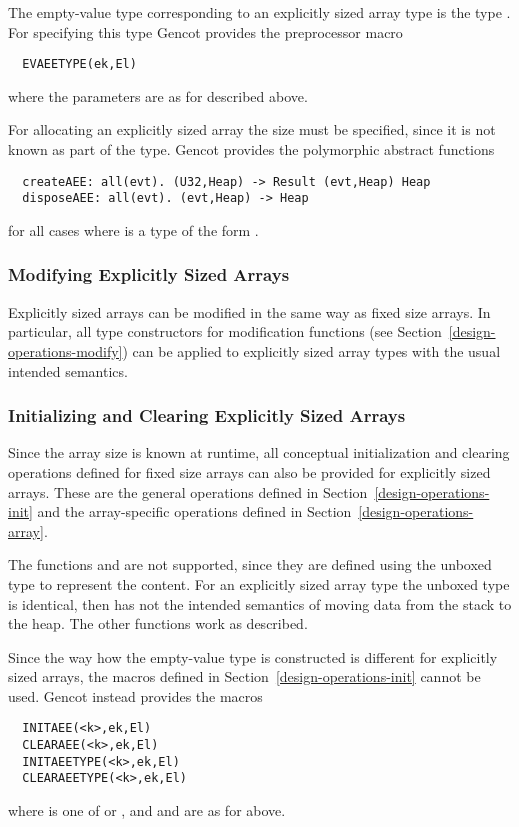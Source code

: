 The empty-value type corresponding to an explicitly sized array type  is the type .
For specifying this type Gencot provides the preprocessor macro
\begin{verbatim}
  EVAEETYPE(ek,El)
\end{verbatim}
where the parameters are as for  described above. 

For allocating an explicitly sized array the size must be specified, since it is not known as part of the type.
Gencot provides the polymorphic abstract functions
\begin{verbatim}
  createAEE: all(evt). (U32,Heap) -> Result (evt,Heap) Heap
  disposeAEE: all(evt). (evt,Heap) -> Heap
\end{verbatim}
for all cases where  is a type of the form .

\subsubsection{Modifying Explicitly Sized Arrays}

Explicitly sized arrays can be modified in the same way as fixed size arrays. In particular, 
all type constructors for modification functions (see Section~\ref{design-operations-modify}) can be applied to 
explicitly sized array types with the usual intended semantics. 

\subsubsection{Initializing and Clearing Explicitly Sized Arrays}

Since the array size is known at runtime, all conceptual initialization and clearing operations defined for fixed
size arrays can also be provided for explicitly sized arrays. These are the general operations defined in 
Section~\ref{design-operations-init} and the array-specific operations defined in Section~\ref{design-operations-array}.

The functions  and  are not supported, since they are defined using the unboxed type 
to represent the content. For an explicitly sized array type the unboxed type is identical, then  has not the
intended semantics of moving data from the stack to the heap. The other functions work as described.

Since the way how the empty-value type is constructed is different for explicitly sized arrays, the macros defined in
Section~\ref{design-operations-init} cannot be used. Gencot instead provides the macros
\begin{verbatim}
  INITAEE(<k>,ek,El)
  CLEARAEE(<k>,ek,El)
  INITAEETYPE(<k>,ek,El)
  CLEARAEETYPE(<k>,ek,El)
\end{verbatim}
where  is one of  or , and  and  are as for  above.

